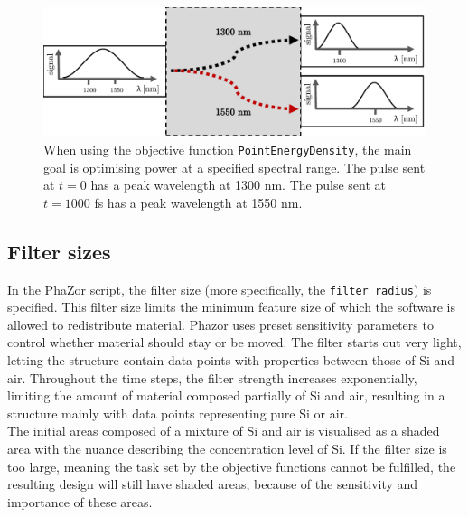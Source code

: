 \vspace{1cm}
 
\begin{figure}[h!]
    \centering
    \includegraphics[width=1.0\textwidth]
    {fig/design/objectivefunctionsped.pdf}
    \caption{When using the objective function \texttt{PointEnergyDensity}, the main goal is optimising power at a specified spectral range. The pulse sent at $t=0$ has a peak wavelength at 1300 nm. The pulse sent at $t= 1000$ fs has a peak wavelength at 1550 nm.}
    \label{fig:objectiveFunctionPED}
\end{figure}
\vspace{1cm}

\subsection{Filter sizes}

In the PhaZor script, the filter size (more specifically, the  \texttt{filter radius}) is specified. This filter size limits the minimum feature size of which the software is allowed to redistribute material. Phazor uses preset sensitivity parameters to control whether material should stay or be moved. The filter starts out very light, letting the structure contain data points with properties between those of Si and air. Throughout the time steps, the filter strength increases exponentially, limiting the amount of material composed partially of Si and air, resulting in a structure mainly with data points representing pure Si or air. \\

The initial areas composed of a mixture of Si and air is visualised as a shaded area with the nuance describing the concentration level of Si. If the filter size is too large, meaning the task set by the objective functions cannot be fulfilled, the resulting design will still have shaded areas, because of the sensitivity and importance of these areas.
\vspace{1cm}
